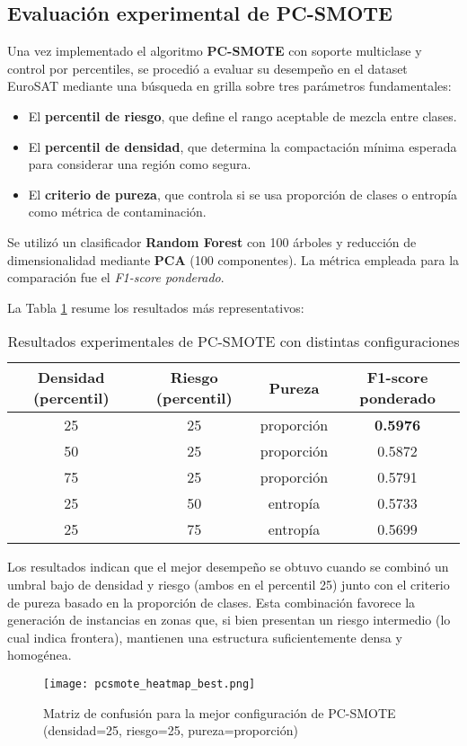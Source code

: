 \subsection{Evaluación experimental de PC-SMOTE}

Una vez implementado el algoritmo \textbf{PC-SMOTE} con soporte multiclase y control por percentiles, se procedió a evaluar su desempeño en el dataset EuroSAT mediante una búsqueda en grilla sobre tres parámetros fundamentales:

\begin{itemize}
  \item El \textbf{percentil de riesgo}, que define el rango aceptable de mezcla entre clases.
  \item El \textbf{percentil de densidad}, que determina la compactación mínima esperada para considerar una región como segura.
  \item El \textbf{criterio de pureza}, que controla si se usa proporción de clases o entropía como métrica de contaminación.
\end{itemize}

Se utilizó un clasificador \textbf{Random Forest} con 100 árboles y reducción de dimensionalidad mediante \textbf{PCA} (100 componentes). La métrica empleada para la comparación fue el \textit{F1-score ponderado}.

La Tabla \ref{tab:pcsmote_grid_results} resume los resultados más representativos:

\begin{table}[H]
\centering
\caption{Resultados experimentales de PC-SMOTE con distintas configuraciones}
\label{tab:pcsmote_grid_results}
\begin{tabular}{|c|c|c|c|}
\hline
\textbf{Densidad (percentil)} & \textbf{Riesgo (percentil)} & \textbf{Pureza} & \textbf{F1-score ponderado} \\
\hline
25 & 25 & proporción & \textbf{0.5976} \\
50 & 25 & proporción & 0.5872 \\
75 & 25 & proporción & 0.5791 \\
25 & 50 & entropía   & 0.5733 \\
25 & 75 & entropía   & 0.5699 \\
\hline
\end{tabular}
\end{table}

Los resultados indican que el mejor desempeño se obtuvo cuando se combinó un umbral bajo de densidad y riesgo (ambos en el percentil 25) junto con el criterio de pureza basado en la proporción de clases. Esta combinación favorece la generación de instancias en zonas que, si bien presentan un riesgo intermedio (lo cual indica frontera), mantienen una estructura suficientemente densa y homogénea.

\begin{figure}[H]
  \centering
  \texttt{[image: pcsmote\_heatmap\_best.png]}
  \caption{Matriz de confusión para la mejor configuración de PC-SMOTE (densidad=25, riesgo=25, pureza=proporción)}
  \label{fig:pcsmote_best_heatmap}
\end{figure}

